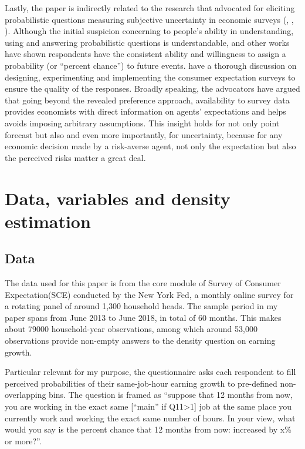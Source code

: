 \documentclass[12pt,notitlepage,onecolumn,aps,pra]{article}
\begin{document}
Lastly, the paper is indirectly related to the research that advocated
for eliciting probabilistic questions measuring subjective uncertainty
in economic surveys (\cite{manski_measuring_2004},
\cite{delavande2011measuring}, \cite{manski_survey_2018}). Although the
initial suspicion concerning to people's ability in understanding, using
and answering probabilistic questions is understandable,
\cite{bertrand_people_2001} and other works have shown respondents have
the consistent ability and willingness to assign a probability (or
``percent chance'') to future events. \cite{armantier_overview_2017}
have a thorough discussion on designing, experimenting and implementing
the consumer expectation surveys to ensure the quality of the responses.
Broadly speaking, the advocators have argued that going beyond the
revealed preference approach, availability to survey data provides
economists with direct information on agents' expectations and helps
avoids imposing arbitrary assumptions. This insight holds for not only
point forecast but also and even more importantly, for uncertainty,
because for any economic decision made by a risk-averse agent, not only
the expectation but also the perceived risks matter a great deal.


    \hypertarget{data-variables-and-density-estimation}{%
\section{Data, variables and density
estimation}\label{data-variables-and-density-estimation}}

\hypertarget{data}{%
\subsection{Data}\label{data}}

The data used for this paper is from the core module of Survey of
Consumer Expectation(SCE) conducted by the New York Fed, a monthly
online survey for a rotating panel of around 1,300 household heads. The
sample period in my paper spans from June 2013 to June 2018, in total of
60 months. This makes about 79000 household-year observations, among
which around 53,000 observations provide non-empty answers to the
density question on earning growth.

Particular relevant for my purpose, the questionnaire asks each
respondent to fill perceived probabilities of their same-job-hour
earning growth to pre-defined non-overlapping bins. The question is
framed as ``suppose that 12 months from now, you are working in the
exact same {[}``main'' if Q11\textgreater{}1{]} job at the same place
you currently work and working the exact same number of hours. In your
view, what would you say is the percent chance that 12 months from now:
increased by x\% or more?''.
\end{document}
